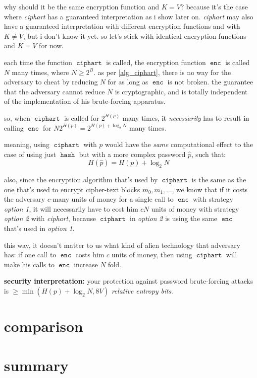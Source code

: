 \documentclass[twocolumn]{article}
\DeclareMathOperator{\enc}{\texttt{enc}}
\DeclareMathOperator{\hash}{\texttt{hash}}
\DeclareMathOperator{\kdf}{\texttt{ciphart}}
\begin{document}
why should it be the same encryption function and $K=V$?  because it's the
case where \emph{ciphart} has a guaranteed interpretation as i show later
on.  \emph{ciphart} may also have a guaranteed interpretation with
different encryption functions and with $K \ne V$, but i don't know it yet.
so let's stick with identical encryption functions and $K=V$ for now.

each time the function $\kdf$ is called, the encryption function $\enc$ is
called $N$ many times, where $N\ge2^B$.  as per \cref{alg_ciphart}, there
is no way for the adversary to cheat by reducing $N$ for as long as $\enc$
is not broken.  the guarantee that the adversary cannot reduce $N$ is
cryptographic, and is totally independent of the implementation of his
brute-forcing apparatus.

so, when $\kdf$ is called for $2^{H(p)}$ many times, it \emph{necessarily}
has to result in calling $\enc$ for $N2^{H(p)} = 2^{H(p) + \log_2N}$ many
times.

meaning, using $\kdf$ with $p$ would have the \emph{same} computational
effect to the case of using just $\hash$ but with a more complex password
$\hat p$, such that:
\begin{equation}
    H(\hat p) = H(p) + \log_2 N
\end{equation}

also, since the encryption algorithm that's used by $\kdf$ is the same as
the one that's used to encrypt cipher-text blocks $m_0, m_1, \ldots$, we
know that if it costs the adversary $c$-many units of money for a single
call to $\enc$ with strategy \emph{option 1}, it will necessarily have to
cost him $cN$ units of money with strategy \emph{option 2} with
\emph{ciphart}, because $\kdf$ in \emph{option 2} is using the same $\enc$
that's used in \emph{option 1}.

this way, it doesn't matter to us what kind of alien technology that
adversary has:  if one call to $\enc$ costs him $c$ units of money, then
using $\kdf$ will make his calls to $\enc$ increase $N$ fold.

\textbf{security interpretation:}  your protection against password
brute-forcing attacks is $\ge \min(H(p) + \log_2 N, 8V)$ \emph{relative
entropy bits}.

\section{comparison}
\section{summary}
\end{document}
